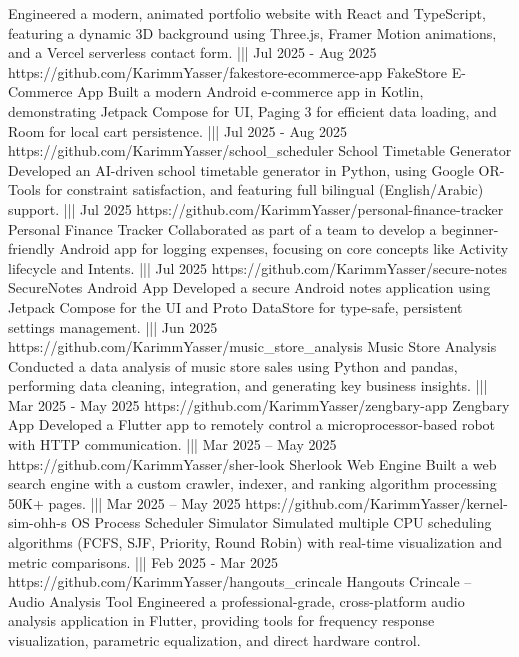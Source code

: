 {    {Engineered a modern, animated portfolio website with React and TypeScript, featuring a dynamic 3D background using Three.js, Framer Motion animations, and a Vercel serverless contact form.}%
    |||
    {Jul 2025 - Aug 2025}%
    {https://github.com/KarimmYasser/fakestore-ecommerce-app}%
    {FakeStore E-Commerce App}%
    {Built a modern Android e-commerce app in Kotlin, demonstrating Jetpack Compose for UI, Paging 3 for efficient data loading, and Room for local cart persistence.}%
    |||
    {Jul 2025 - Aug 2025}%
    {https://github.com/KarimmYasser/school_scheduler}%
    {School Timetable Generator}%
    {Developed an AI-driven school timetable generator in Python, using Google OR-Tools for constraint satisfaction, and featuring full bilingual (English/Arabic) support.}%
    |||
    {Jul 2025}%
    {https://github.com/KarimmYasser/personal-finance-tracker}%
    {Personal Finance Tracker}%
    {Collaborated as part of a team to develop a beginner-friendly Android app for logging expenses, focusing on core concepts like Activity lifecycle and Intents.}%
    |||
    {Jul 2025}%
    {https://github.com/KarimmYasser/secure-notes}%
    {SecureNotes Android App}%
    {Developed a secure Android notes application using Jetpack Compose for the UI and Proto DataStore for type-safe, persistent settings management.}%
    |||
    {Jun 2025}%
    {https://github.com/KarimmYasser/music_store_analysis}%
    {Music Store Analysis}%
    {Conducted a data analysis of music store sales using Python and pandas, performing data cleaning, integration, and generating key business insights.}%
    |||
    {Mar 2025 - May 2025}%
    {https://github.com/KarimmYasser/zengbary-app}%
    {Zengbary App}%
    {Developed a Flutter app to remotely control a microprocessor-based robot with HTTP communication.}%
    |||
    {Mar 2025 – May 2025}%
    {https://github.com/KarimmYasser/sher-look}%
    {Sherlook Web Engine}%
    {Built a web search engine with a custom crawler, indexer, and ranking algorithm processing 50K+ pages.}%
    |||
    {Mar 2025 – May 2025}%
    {https://github.com/KarimmYasser/kernel-sim-ohh-s}%
    {OS Process Scheduler Simulator}%
    {Simulated multiple CPU scheduling algorithms (FCFS, SJF, Priority, Round Robin) with real-time visualization and metric comparisons.}%
    |||
    {Feb 2025 - Mar 2025}%
    {https://github.com/KarimmYasser/hangouts_crincale}%
    {Hangouts Crincale – Audio Analysis Tool}%
    {Engineered a professional-grade, cross-platform audio analysis application in Flutter, providing tools for frequency response visualization, parametric equalization, and direct hardware control.}%
}
